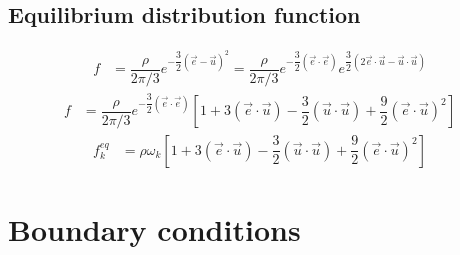 \documentclass[12pt,a4paper]{report}
\begin{document}
	\subsection{Equilibrium distribution function}
		\begin{align}
			f &= \dfrac{\rho}{2\pi/3}e^{-\dfrac{3}{2}(\vec{e}-\vec{u})^2} = \dfrac{\rho}{2\pi/3}e^{-\dfrac{3}{2}(\vec{e}\cdot\vec{e})}e^{\dfrac{3}{2}(2\vec{e}\cdot\vec{u} - \vec{u}\cdot\vec{u})}
		\end{align}
		\begin{align}
			f &= \dfrac{\rho}{2\pi/3}e^{-\dfrac{3}{2}(\vec{e}\cdot\vec{e})}\left[1+3\left(\vec{e}\cdot\vec{u}\right) - \dfrac{3}{2}(\vec{u}\cdot\vec{u}) + \dfrac{9}{2}(\vec{e}\cdot\vec{u})^2\right]		
		\end{align}
		\begin{align}
			f^{eq}_k &= \rho\omega_k\left[1+3\left(\vec{e}\cdot\vec{u}\right) - \dfrac{3}{2}(\vec{u}\cdot\vec{u}) + \dfrac{9}{2}(\vec{e}\cdot\vec{u})^2\right]
		\end{align}
	
	\section{Boundary conditions}
	
\end{document}
